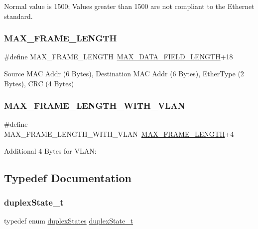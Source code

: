Normal value is 1500; Values greater than 1500 are not compliant to the Ethernet standard. 

\mbox{\label{group__ethernet_gaecae779890dfc6b313fe2854369e5497}} 
\subsubsection{\texorpdfstring{MAX\_FRAME\_LENGTH}{MAX\_FRAME\_LENGTH}}
{\footnotesize\ttfamily \#define M\+A\+X\+\_\+\+F\+R\+A\+M\+E\+\_\+\+L\+E\+N\+G\+TH~\mbox{\hyperlink{group__ethernet_ga7e41863aa11f513f9f3e6f29535b56e3}{M\+A\+X\+\_\+\+D\+A\+T\+A\+\_\+\+F\+I\+E\+L\+D\+\_\+\+L\+E\+N\+G\+TH}}+18}



Source M\+AC Addr (6 Bytes), Destination M\+AC Addr (6 Bytes), Ether\+Type (2 Bytes), C\+RC (4 Bytes) 

\mbox{\label{group__ethernet_ga828c657a62d97cb7339451fc46589c6e}} 
\subsubsection{\texorpdfstring{MAX\_FRAME\_LENGTH\_WITH\_VLAN}{MAX\_FRAME\_LENGTH\_WITH\_VLAN}}
{\footnotesize\ttfamily \#define M\+A\+X\+\_\+\+F\+R\+A\+M\+E\+\_\+\+L\+E\+N\+G\+T\+H\+\_\+\+W\+I\+T\+H\+\_\+\+V\+L\+AN~\mbox{\hyperlink{group__ethernet_gaecae779890dfc6b313fe2854369e5497}{M\+A\+X\+\_\+\+F\+R\+A\+M\+E\+\_\+\+L\+E\+N\+G\+TH}}+4}



Additional 4 Bytes for V\+L\+AN\+: 



\subsection{Typedef Documentation}
\mbox{\label{group__ethernet_gaf88782ec3aef6eb80f7fb5bcc4fb1401}} 
\subsubsection{\texorpdfstring{duplexState\_t}{duplexState\_t}}
{\footnotesize\ttfamily typedef enum \mbox{\hyperlink{group__ethernet_ga07afd358acdd48dc34d82f6ed379316f}{duplex\+States}}  \mbox{\hyperlink{group__ethernet_gaf88782ec3aef6eb80f7fb5bcc4fb1401}{duplex\+State\+\_\+t}}}

